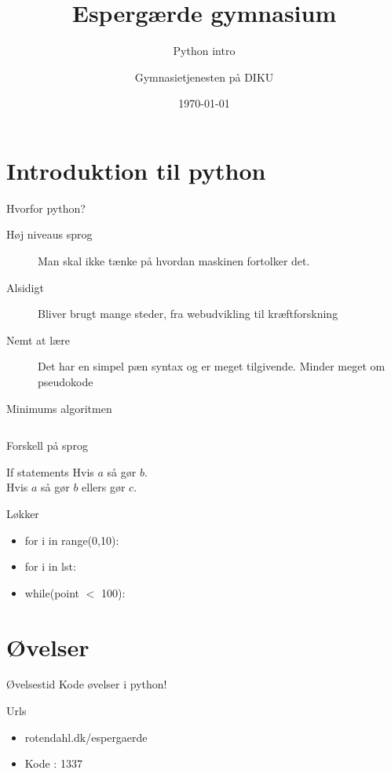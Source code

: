\documentclass[12pt,t]{beamer}
\title{Espergærde gymnasium}
\subtitle{Python intro}
\author{
        Gymnasietjenesten på DIKU
}
\date[]{\today}
\begin{document}
\frame[plain]{\titlepage}
 \frame{\tableofcontents}

 \section{Introduktion til python}
     \begin{frame}[t]{Hvorfor python?}
         \begin{description}
             \item[Høj niveaus sprog] Man skal ikke tænke på hvordan
             maskinen fortolker det.
             \pause
             \item[Alsidigt] Bliver brugt mange steder,
             fra webudvikling til kræftforskning
             \pause
             \item[Nemt at lære] Det har en simpel pæn syntax og er meget
             tilgivende. Minder meget om pseudokode
         \end{description}
         \pause
         \begin{block}{Minimums algoritmen}
               \inputminted{python}{min.py}
        \end{block}
     \end{frame}


    \begin{frame}[t]{Forskell på sprog}
        \begin{block}{If statements}
            Hvis $a$ så gør $b$. \\
            Hvis $a$ så gør $b$ ellers gør $c$.
        \end{block}
        \begin{block}{Løkker}
            \begin{itemize}
                \item for i in range(0,10):
                \pause \item for i in lst:
                \pause \item while(point $<$ 100):
            \end{itemize}
    \end{block}
    \end{frame}


    \section{Øvelser}
    \begin{frame}[t]{Øvelsestid}
        Kode øvelser i python!

        \begin{block}{Urls}
            \begin{itemize}
                \item rotendahl.dk/espergaerde
                \item Kode : 1337
            \end{itemize}
        \end{block}
    \end{frame}




\end{document}
